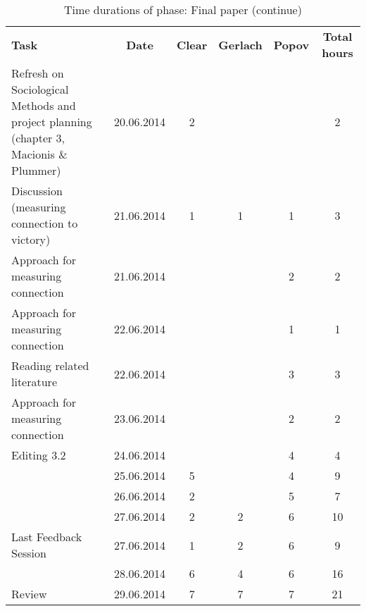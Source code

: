 \begin{table}[H]

\begin{threeparttable}

  \caption{Time durations of phase: Final paper (continue)}
  
  \begin{tabular}{p{3cm} c|c c c| c}
      \textbf{Task} & \textbf{Date}& \textbf{Clear} & \textbf{Gerlach} & \textbf{Popov} & \textbf{Total hours} \\

Refresh on Sociological Methods and project planning (chapter 3, Macionis \& Plummer)
                        & 20.06.2014 & 2  & & & 2 \\
		Discussion (measuring connection to victory)
        				& 21.06.2014  &	 1	&		1	&	1	&	3 \\                     
Approach for measuring connection
        				& 21.06.2014  &		&			&	2	&	2 \\                             Approach for measuring connection
        				& 22.06.2014  &		&			&	1	&	1 \\    
        Reading related literature
        				& 22.06.2014  &		&			&	3	&	3 \\    
 Approach for measuring connection
        				& 23.06.2014  &		&			&	2	&	2 \\                             
 Editing 3.2
        				& 24.06.2014  &		&			&	4	&	4 \\
        				& 25.06.2014  &	5	&			&	4	&	9 \\
        				& 26.06.2014  &	 2	&			&	5	&	7 \\
        				& 27.06.2014  &	2	&	2		&	6	&	10 \\                                             
Last Feedback Session   & 27.06.2014  &   1 &    2 &   6   &   9 \\
        				& 28.06.2014  &	6	&	4		&	6	&	16 \\  
        				
  Review                & 29.06.2014  &   7  &   7       &   7    &   21 \\



\end{tabular}

\end{threeparttable}


\end{table}

